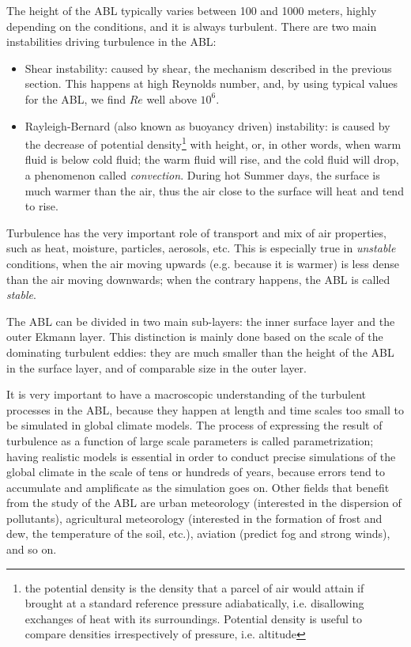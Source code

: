 \documentclass[a4paper]{book}
\begin{document}
The height of the ABL typically varies between 100 and 1000 meters, highly depending on the conditions, and it is always turbulent. There are two main instabilities driving turbulence in the ABL:

\begin{itemize}
\item Shear instability: caused by shear, the mechanism described in the previous section. This happens at high Reynolds number, and, by using typical values for the ABL, we find $Re$ well above $10^6$.
\item Rayleigh-Bernard (also known as buoyancy driven) instability: is caused by the decrease of potential density\footnote{the potential density is the density that a parcel of air would attain if brought at a standard reference pressure adiabatically, i.e. disallowing exchanges of heat with its surroundings. Potential density is useful to compare densities irrespectively of pressure, i.e. altitude} with height, or, in other words, when warm fluid is below cold fluid; the warm fluid will rise, and the cold fluid will drop, a phenomenon called \emph{convection}. During hot Summer days, the surface is much warmer than the air, thus the air close to the surface will heat and tend to rise.
\end{itemize}

Turbulence has the very important role of transport and mix of air properties, such as heat, moisture, particles, aerosols, etc. This is especially true in \emph{unstable} conditions, when the air moving upwards (e.g. because it is warmer) is less dense than the air moving downwards; when the contrary happens, the ABL is called \emph{stable}.

The ABL can be divided in two main sub-layers: the inner surface layer and the outer Ekmann layer. This distinction is mainly done based on the scale of the dominating turbulent eddies: they are much smaller than the height of the ABL in the surface layer, and of comparable size in the outer layer.

It is very important to have a macroscopic understanding of the turbulent processes in the ABL, because they happen at length and time scales too small to be simulated in global climate models. The process of expressing the result of turbulence as a function of large scale parameters is called parametrization; having realistic models is essential in order to conduct precise simulations of the global climate in the scale of tens or hundreds of years, because errors tend to accumulate and amplificate as the simulation goes on. Other fields that benefit from the study of the ABL are urban meteorology (interested in the dispersion of pollutants), agricultural meteorology (interested in the formation of frost and dew, the temperature of the soil, etc.), aviation (predict fog and strong winds), and so on.
\end{document}
